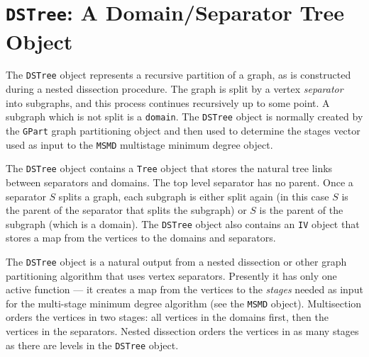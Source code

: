 \chapter{{\tt DSTree}: \break A Domain/Separator Tree Object}
\label{chapter:DSTree:intro}
\par
The {\tt DSTree} object represents a recursive partition of a
graph, as is constructed during a nested dissection procedure.
The graph is split by a vertex {\it separator} into subgraphs,
and this process continues recursively up to some point.
A subgraph which is not split is a {\tt domain}.
The {\tt DSTree} object is normally created by the {\tt GPart}
graph partitioning object and then used to determine the 
stages vector used as input to the {\tt MSMD} multistage minimum
degree object.
\par
The {\tt DSTree} object contains a {\tt Tree} object that stores 
the natural tree links between separators and domains.
The top level separator has no parent.
Once a separator $S$ splits a graph, each subgraph is either split
again (in this case $S$ is the parent of the separator that splits the
subgraph) or $S$ is the parent of the subgraph (which is a
domain).
The {\tt DSTree} object also contains an {\tt IV} object that stores 
a map from the vertices to the domains and separators.
\par
The {\tt DSTree} object is a natural output from a nested
dissection or other graph partitioning algorithm that uses vertex
separators.
Presently it has only one active function --- it creates a map from
the vertices to the {\it stages} needed as input for the
multi-stage minimum degree algorithm (see the {\tt MSMD} object).
Multisection orders the vertices in two stages: all vertices in the
domains first, then the vertices in the separators.
Nested dissection orders the vertices in as many stages as there
are levels in the {\tt DSTree} object.
